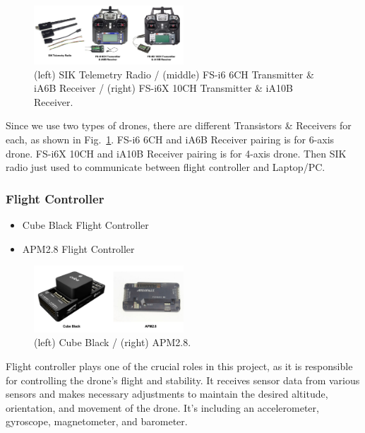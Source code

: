     \begin{figure}[H]
        \centerline{\includegraphics[width=0.5\textwidth]{Figures/Methods/Transistors&Receivers.png}}
        \caption{(left) SIK Telemetry Radio / (middle) FS-i6 6CH Transmitter \& iA6B Receiver / (right) FS-i6X 10CH Transmitter \& iA10B Receiver.}
        \label{fig2}
    \end{figure}

    Since we use two types of drones, there are different Transistors \& Receivers for each, as shown in Fig.~\ref{fig2}. FS-i6 6CH and iA6B Receiver pairing is for 6-axis drone. FS-i6X 10CH and iA10B Receiver pairing is for 4-axis drone. Then SIK radio just used to communicate between flight controller and Laptop/PC.
    
    \subsubsection{Flight Controller}\label{subsection:A3}
    \begin{itemize}
        \item Cube Black Flight Controller
        \item APM2.8 Flight Controller
    \end{itemize}

    \begin{figure}[H]
        \centerline{\includegraphics[width=0.5\textwidth]{Figures/Methods/Flight_Controllers.png}}
        \caption{(left) Cube Black / (right) APM2.8.}
        \label{fig3}
    \end{figure}

    Flight controller plays one of the crucial roles in this project, as it is responsible for controlling the drone's flight and stability. It receives sensor data from various sensors and makes necessary adjustments to maintain the desired altitude, orientation, and movement of the drone. It's including an accelerometer, gyroscope, magnetometer, and barometer.


